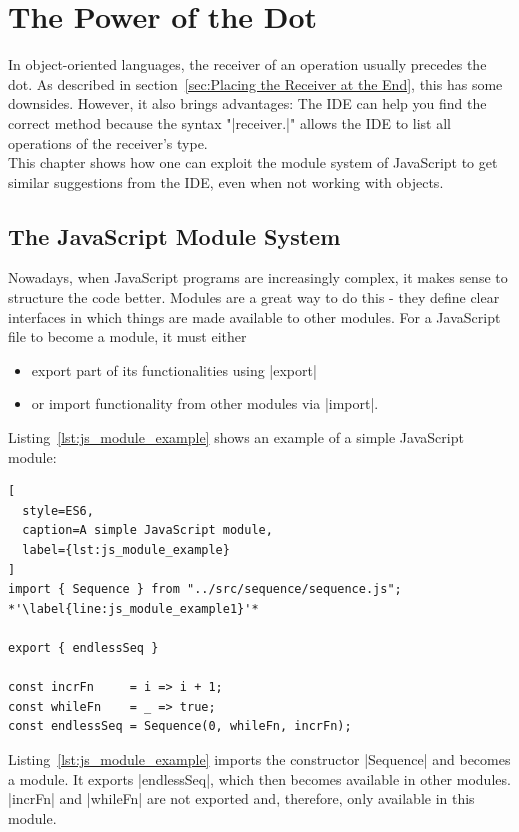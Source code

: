 \chapter{The Power of the Dot} %
\label{chap:The Power of the Dot}
In object-oriented languages, the receiver of an operation usually precedes the
dot. As described in section~\ref{sec:Placing the Receiver at the End}, this
has some downsides. However, it also brings advantages: The IDE can help you
find the correct method because the syntax "|receiver.|" allows the IDE to list
all operations of the receiver's type. \cite[Ch. "The Power of the
Dot"]{frege_goodness} \\ 
This chapter shows how one can exploit the module
system of JavaScript to get similar suggestions from the IDE, even when not
working with objects.

\section{The JavaScript Module System} %
\label{sec:The JavaScript Module System}

Nowadays, when JavaScript programs are increasingly complex, it makes sense to
structure the code better. Modules are a great way to do this - they define
clear interfaces in which things are made available to other modules.
For a JavaScript file to become a module, it must either
\begin{itemize}
  \item export part of its functionalities using |export|
  \item or import functionality from other modules via |import|.
\end{itemize}

Listing~\ref{lst:js_module_example} shows an example of a simple JavaScript
module:
\begin{lstlisting}[
  style=ES6,
  caption=A simple JavaScript module,
  label={lst:js_module_example}
]
import { Sequence } from "../src/sequence/sequence.js"; *'\label{line:js_module_example1}'*

export { endlessSeq }

const incrFn     = i => i + 1;
const whileFn    = _ => true;
const endlessSeq = Sequence(0, whileFn, incrFn);
\end{lstlisting}

Listing~\ref{lst:js_module_example} imports the constructor |Sequence| and
becomes a module. It exports |endlessSeq|, which then becomes available in
other modules. |incrFn| and |whileFn| are not exported and, therefore, only
available in this module.

